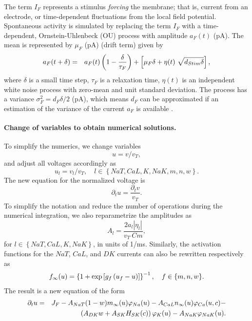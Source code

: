 \documentclass[12pt]{article}
\begin{document}
The term $I_{F}$ represents a stimulus \textit{forcing} the membrane; that is, current from an electrode, or time-dependent fluctuations from the local field potential. 
Spontaneous activity is simulated by replacing the term $I_{F}$ with a  time-dependent, Ornstein-Uhlenbeck (OU) process with amplitude $a_{F}(t)$ (pA). The mean is represented by  $\mu_{F}$ (pA) (drift term)
\citep{rudolph2003characterization}  given by \citep{gillespie1996mathematics,
  gillespie1996exact} 
\begin{eqnarray}
{a}_{F}(t+\delta) &=& a_{F}(t) \left(1 -  \frac{\delta}{\tau_{F}}\right)  +
\left[ \mu_{F} \delta + \eta(t) ~\sqrt{d_{Stim} \delta}\right],
\label{eq:OU}
\end{eqnarray}
where $\delta$ is a small time step, $\tau_{F}$ is a relaxation time,  $\eta(t)$ is an independent
white noise process with zero-mean and unit standard deviation. The process has a variance
$\sigma_{F}^2 = d_{F} \delta /2$ (pA), which means $d_{F}$ can be
approximated if an estimation of the variance of the current $a_{F}$ is
available \citep{rudolph2004method,destexhe2004novel}.  

\paragraph{Change of variables to obtain numerical solutions.}
To simplify the numerics, we change variables $$u = v/v_T,$$ and adjust all voltages accordingly as $$u_l = v_l/v_T, \quad l \in \left\{NaT,CaL,K,NaK,m,n,w \right\}.$$ 
The new equation for the normalized voltage is $$\partial_t u = \frac{\partial_t v}{v_T}.$$
To simplify the notation and reduce the number of operations during the numerical integration, we also reparametrize the amplitudes as 
\begin{equation}A_l = \frac{2 a_l |\eta_l|}{v_T~Cm}, \label{eq:normA}
\end{equation} 
for $l \in \left\{NaT,CaL,K,NaK \right\}$, in units of 1/ms. 
Similarly,
the activation functions for the $NaT$, $CaL$, and $DK$ currents can also be rewritten respectively
as 
\begin{equation}
f_{\infty}(u) = \left\{1 + \exp\left[g_f \left(u_f-u \right) \right]\right\}^{-1}, \quad{f \in  \left\{m,n,w \right\}}.
\end{equation}
The result is a new equation of the form
\begin{eqnarray}
\partial_t u &=& J_F -A_{NaT}(1-w)m_{\infty}(u) \varphi_{Na}(u) - A_{CaL}n_{\infty}(u) \varphi_{Ca}(u,c)- \notag \\
&& \left(A_{DK}w + A_{SK}H_{SK}(c)\right)\varphi_{K}(u)- A_{NaK}\varphi_{NaK}(u
).
\end{eqnarray}
 
\end{document}
